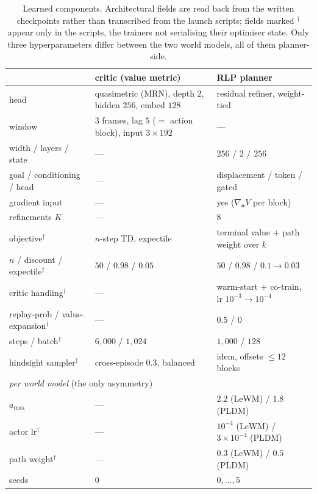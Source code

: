 \begin{table}[h]
\centering\small
\caption{Learned components. Architectural fields are read back from the
written checkpoints rather than transcribed from the launch scripts; fields
marked $^\dagger$ appear only in the scripts, the trainers not serialising their
optimiser state. Only three hyperparameters differ between the two world
models, all of them planner-side.}
\begin{tabular}{lll}
\toprule
 & critic (value metric) & RLP planner \\
\midrule
head & quasimetric (MRN), depth $2$, hidden $256$, embed $128$
 & residual refiner, weight-tied \\
window & $3$ frames, lag $5$ ($=$ action block), input $3\times192$
 & --- \\
width / layers / state
 & ---
 & $256$ / $2$ / $256$ \\
goal / conditioning / head
 & ---
 & displacement / token / gated \\
gradient input & --- & yes ($\nabla_{\mathbf a}V$ per block) \\
refinements $K$ & --- & $8$ \\
objective$^\dagger$ & $n$-step TD, expectile & terminal value $+$ path weight over $k$ \\
$n$ / discount / expectile$^\dagger$ & $50$ / $0.98$ / $0.05$ & $50$ / $0.98$ / $0.1\!\to\!0.03$ \\
critic handling$^\dagger$ & --- & warm-start $+$ co-train, lr $10^{-3}\!\to\!10^{-4}$ \\
replay-prob / value-expansion$^\dagger$ & --- & $0.5$ / $0$ \\
steps / batch$^\dagger$ & $6{,}000$ / $1{,}024$ & $1{,}000$ / $128$ \\
hindsight sampler$^\dagger$ & cross-episode $0.3$, balanced & idem, offsets $\le 12$ blocks \\
\midrule
\multicolumn{3}{l}{\emph{per world model} (the only asymmetry)} \\
\quad $a_{\max}$ & --- & $2.2$ (LeWM) / $1.8$ (PLDM) \\
\quad actor lr$^\dagger$ & --- & $10^{-4}$ (LeWM) / $3\!\times\!10^{-4}$ (PLDM) \\
\quad path weight$^\dagger$ & --- & $0.3$ (LeWM) / $0.5$ (PLDM) \\
\midrule
seeds & $0$ & $0,\dots,5$ \\
\bottomrule
\end{tabular}
\end{table}

